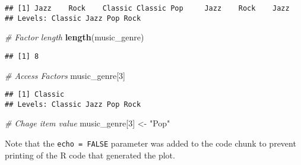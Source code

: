 \documentclass[
]{article}
\newenvironment{Shaded}{\begin{snugshade}}{\end{snugshade}}
\newcommand{\CommentTok}[1]{\textcolor[rgb]{0.56,0.35,0.01}{\textit{#1}}}
\newcommand{\DecValTok}[1]{\textcolor[rgb]{0.00,0.00,0.81}{#1}}
\newcommand{\FunctionTok}[1]{\textcolor[rgb]{0.13,0.29,0.53}{\textbf{#1}}}
\newcommand{\NormalTok}[1]{#1}
\newcommand{\OtherTok}[1]{\textcolor[rgb]{0.56,0.35,0.01}{#1}}
\newcommand{\StringTok}[1]{\textcolor[rgb]{0.31,0.60,0.02}{#1}}
\begin{document}
\begin{verbatim}
## [1] Jazz    Rock    Classic Classic Pop     Jazz    Rock    Jazz   
## Levels: Classic Jazz Pop Rock
\end{verbatim}

\begin{Shaded}
\begin{Highlighting}[]
\CommentTok{\# Factor length}
\FunctionTok{length}\NormalTok{(music\_genre)}
\end{Highlighting}
\end{Shaded}

\begin{verbatim}
## [1] 8
\end{verbatim}

\begin{Shaded}
\begin{Highlighting}[]
\CommentTok{\# Access Factors}
\NormalTok{music\_genre[}\DecValTok{3}\NormalTok{]}
\end{Highlighting}
\end{Shaded}

\begin{verbatim}
## [1] Classic
## Levels: Classic Jazz Pop Rock
\end{verbatim}

\begin{Shaded}
\begin{Highlighting}[]
\CommentTok{\# Chage item value}
\NormalTok{music\_genre[}\DecValTok{3}\NormalTok{] }\OtherTok{\textless{}{-}} \StringTok{"Pop"}
\end{Highlighting}
\end{Shaded}

Note that the \texttt{echo\ =\ FALSE} parameter was added to the code
chunk to prevent printing of the R code that generated the plot.
\end{document}
